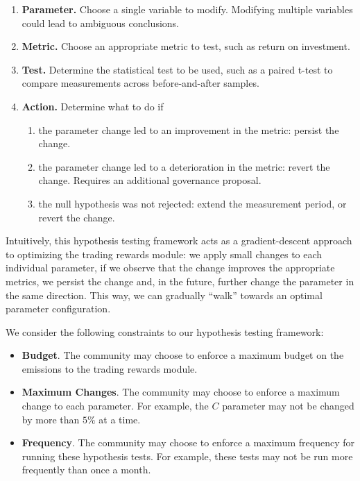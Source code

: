             \begin{enumerate}
                \item \textbf{Parameter.} Choose a single variable to modify. Modifying multiple variables could lead to ambiguous conclusions.
                \item \textbf{Metric.} Choose an appropriate metric to test, such as return on investment.
                \item \textbf{Test.} Determine the statistical test to be used, such as a paired t-test to compare measurements across before-and-after samples.
                \item \textbf{Action.} Determine what to do if
                \begin{enumerate}
                    \item the parameter change led to an improvement in the metric: persist the change.
                    \item the parameter change led to a deterioration in the metric: revert the change. Requires an additional governance proposal. 
                    \item the null hypothesis was not rejected: extend the measurement period, or revert the change. 
                \end{enumerate}
            \end{enumerate}

            Intuitively, this hypothesis testing framework acts as a gradient-descent approach to optimizing the trading rewards module: we apply small changes to each individual parameter, if we observe that the change improves the appropriate metrics, we persist the change and, in the future, further change the parameter in the same direction. This way, we can gradually ``walk'' towards an optimal parameter configuration. 

            We consider the following constraints to our hypothesis testing framework:

            \begin{itemize}
                \item \textbf{Budget}. The community may choose to enforce a maximum budget on the emissions to the trading rewards module.
                \item \textbf{Maximum Changes}. The community may choose to enforce a maximum change to each parameter. For example, the $C$ parameter may not be changed by more than $5\%$ at a time.
                \item \textbf{Frequency}. The community may choose to enforce a maximum frequency for running these hypothesis tests. For example, these tests may not be run more frequently than once a month.
            \end{itemize}

